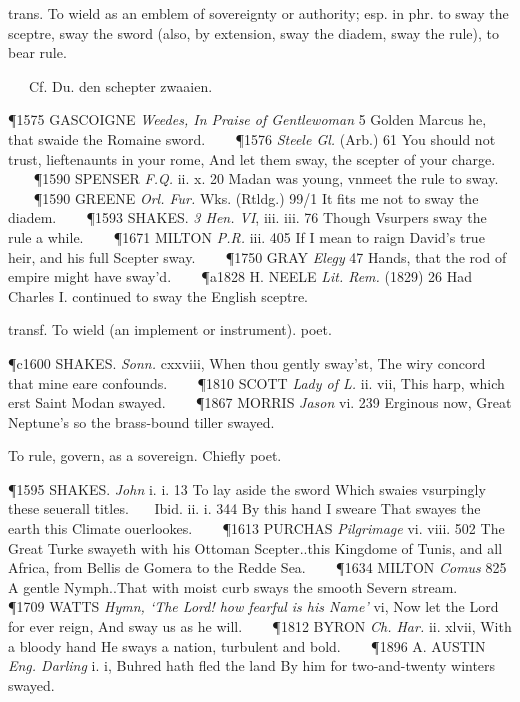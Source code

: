 \begin{description}[wide, labelwidth=!, labelindent=0pt]
\begin{myenumerate}
 trans. To wield as an emblem of sovereignty or authority; esp. in phr. to sway the sceptre, sway the sword (also, by extension, sway the diadem, sway the rule), to bear rule.

   Cf. Du. den schepter zwaaien.

\P 1575 GASCOIGNE  \textit{Weedes, In Praise of Gentlewoman} 5 Golden Marcus he, that swaide the Romaine sword.    
\P 1576  \textit{ Steele Gl.} (Arb.) 61 You should not trust, lieftenaunts in your rome, And let them sway, the scepter of your charge.    
\P 1590 SPENSER  \textit{F.Q.} ii. x. 20 Madan was young, vnmeet the rule to sway.    
\P 1590 GREENE  \textit{Orl. Fur.} Wks. (Rtldg.) 99/1 It fits me not to sway the diadem.    
\P 1593 SHAKES.  \textit{3 Hen. VI}, iii. iii. 76 Though Vsurpers sway the rule a while.    
\P 1671 MILTON  \textit{P.R.} iii. 405 If I mean to raign David's true heir, and his full Scepter sway.    
\P 1750 GRAY  \textit{Elegy} 47 Hands, that the rod of empire might have sway'd.    
\P a1828 H. NEELE  \textit{Lit. Rem.} (1829) 26 Had Charles I. continued to sway the English sceptre.

 transf. To wield (an implement or instrument). poet.

\P c1600 SHAKES.  \textit{Sonn.} cxxviii, When thou gently sway'st, The wiry concord that mine eare confounds.    
\P 1810 SCOTT  \textit{Lady of L.} ii. vii, This harp, which erst Saint Modan swayed.    
\P 1867 MORRIS  \textit{Jason} vi. 239 Erginous now, Great Neptune's so the brass-bound tiller swayed.

 To rule, govern, as a sovereign. Chiefly poet.

\P 1595 SHAKES.  \textit{John} i. i. 13 To lay aside the sword Which swaies vsurpingly these seuerall titles.    Ibid. ii. i. 344 By this hand I sweare That swayes the earth this Climate ouerlookes.    
\P 1613 PURCHAS  \textit{Pilgrimage} vi. viii. 502 The Great Turke swayeth with his Ottoman Scepter..this Kingdome of Tunis, and all Africa, from Bellis de Gomera to the Redde Sea.    
\P 1634 MILTON  \textit{Comus} 825 A gentle Nymph..That with moist curb sways the smooth Severn stream.    
\P 1709 WATTS  \textit{Hymn, ‘The Lord! how fearful is his Name’} vi, Now let the Lord for ever reign, And sway us as he will.    
\P 1812 BYRON  \textit{Ch. Har.} ii. xlvii, With a bloody hand He sways a nation, turbulent and bold.    
\P 1896 A. AUSTIN  \textit{Eng. Darling} i. i, Buhred hath fled the land By him for two-and-twenty winters swayed.


\end{myenumerate}
\end{description}
